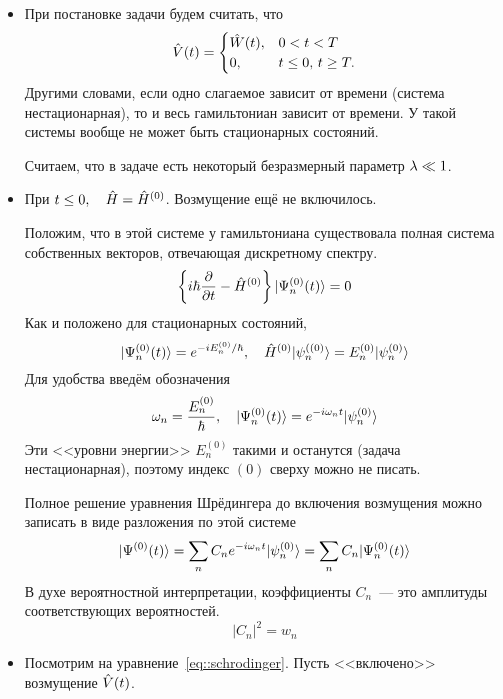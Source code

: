 \begin{itemize}
\item При постановке задачи будем считать, что
$$
    \Hat V(t) =
      \begin{cases}
        \Hat W(t), & 0 < t < T \\
        0, & t \le 0, \, t \ge T.
      \end{cases}
$$
Другими словами, если одно слагаемое зависит от времени (система нестационарная), то и весь гамильтониан зависит от времени.  У такой системы вообще не может быть стационарных состояний.

Считаем, что в задаче есть некоторый безразмерный параметр $\lambda \ll 1$.
\item При $t \le 0, \quad \Hat H = \Hat H^{(0)}$. Возмущение ещё не включилось.

Положим, что в этой системе у гамильтониана существовала полная система собственных векторов, отвечающая дискретному спектру.
$$
    \left\{
    i\hbar \dfrac{\partial}{\partial t} - \hat H^{(0)}     \right\} | \Psi_{n}^{(0)} (t) \rangle = 0
$$
Как и положено для стационарных состояний,
$$
    | \Psi_{n}^{(0)} (t) \rangle = e^{- i E_n^{(0)} / \hbar}, \quad \Hat H^{(0)} | \psi_{n}^{((0)} \rangle = E_n^{(0)} | \psi_n^{(0)} \rangle
$$
Для удобства введём обозначения
$$
    \omega_n = \dfrac{E_n^{(0)}}{\hbar}, \quad | \Psi_n^{(0)} (t) \rangle = e^{-i \omega_n t} | \psi_n^{(0)} \rangle
$$
Эти <<уровни энергии>> $E_n^{(0)}$ такими и останутся (задача нестационарная), поэтому индекс $(0)$ сверху можно не писать.

Полное решение уравнения Шрёдингера до включения возмущения можно записать в виде разложения по этой системе
$$
    | \Psi^{(0)} (t) \rangle = \sum_n C_n e^{-i \omega_n t} | \psi_n^{(0)} \rangle =
\sum_n C_n | \Psi_n^{(0)} (t) \rangle
$$
В духе вероятностной интерпретации, коэффициенты $C_n$~--- это амплитуды соответствующих вероятностей.
$$
    |C_n|^2 = w_n
$$
\item  Посмотрим на уравнение~\eqref{eq::schrodinger}. Пусть <<включено>> возмущение $\Hat V(t)$.


\end{itemize}
